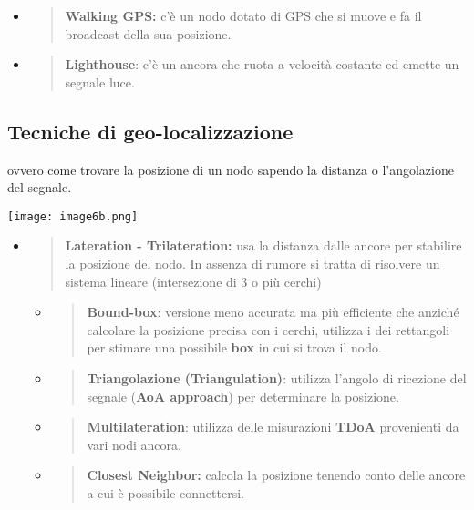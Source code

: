 \begin{itemize}
\begin{itemize}
    \begin{itemize}
    \item
      \begin{quote}
      \textbf{Walking GPS:} c'è un nodo dotato di GPS che si muove e fa
      il broadcast della sua posizione.
      \end{quote}
    \item
      \begin{quote}
      \textbf{Lighthouse}: c'è un ancora che ruota a velocità costante
      ed emette un segnale luce.
      \end{quote}
    \end{itemize}
  \end{itemize}
\end{itemize}

\subsection{Tecniche di
geo-localizzazione}\label{tecniche-di-geo-localizzazione}

ovvero come trovare la posizione di un nodo sapendo la distanza o
l'angolazione del segnale.

\texttt{[image: image6b.png]}

\begin{itemize}
\item
  \begin{quote}
  \textbf{Lateration - Trilateration:} usa la distanza dalle ancore per
  stabilire la posizione del nodo. In assenza di rumore si tratta di
  risolvere un sistema lineare (intersezione di 3 o più cerchi)
  \end{quote}

  \begin{itemize}
  \item
    \begin{quote}
    \textbf{Bound-box}: versione meno accurata ma più efficiente che
    anziché calcolare la posizione precisa con i cerchi, utilizza i dei
    rettangoli per stimare una possibile \textbf{box} in cui si trova il
    nodo.
    \end{quote}
  \item
    \begin{quote}
    \textbf{Triangolazione (Triangulation)}: utilizza l'angolo di
    ricezione del segnale (\textbf{AoA approach}) per determinare la
    posizione.
    \end{quote}
  \item
    \begin{quote}
    \textbf{Multilateration}: utilizza delle misurazioni \textbf{TDoA}
    provenienti da vari nodi ancora.
    \end{quote}
  \item
    \begin{quote}
    \textbf{Closest Neighbor:} calcola la posizione tenendo conto delle
    ancore a cui è possibile connettersi.
    \end{quote}
  \end{itemize}
\end{itemize}

